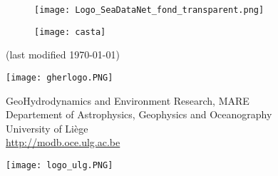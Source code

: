 \begin{titlepage}


\begin{figure}[H]
\centering
\texttt{[image: Logo\_SeaDataNet\_fond\_transparent.png]}
\end{figure}

\begin{center}
\vspace*{1cm}

\colorbox{grey}{
	\parbox[t]{1.0\linewidth}{
	\huge
		\printtitle 
		\vspace*{0.7cm}
	}
}

  	\vspace*{1cm}
  	
\printauthor								%

\vspace*{1cm}


\begin{figure}[H]
\centering
\texttt{[image: casta]}
\end{figure}

\normalsize{(last modified \today)}

\vfill

\parbox{.20\textwidth}{
\flushleft
\texttt{[image: gherlogo.PNG]}
}\parbox{.60\textwidth}{
\centering
\vspace{.4cm}


\footnotesize{GeoHydrodynamics and Environment Research, MARE\\ 
Departement of Astrophysics, Geophysics and Oceanography\\
University of Li\`{e}ge\\ 
\url{http://modb.oce.ulg.ac.be}
}
\vspace{.15cm}
}\parbox{.20\textwidth}{
\flushright
\texttt{[image: logo\_ulg.PNG]}
}

\end{center}

\end{titlepage}

%
%

